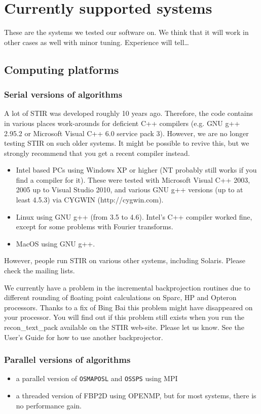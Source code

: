\documentclass{article}
\begin{document}
\section{
Currently supported systems}

These are the systems we tested our software on. We think that 
it will work in other cases as well with minor tuning. Experience 
will tell\dots 



\subsection{
Computing platforms}


\subsubsection{
Serial versions of algorithms}
A lot of STIR was developed roughly 10 years ago. Therefore, the code
contains in various places work-arounds for deficient C++ compilers
(e.g. GNU g++ 2.95.2 or Microsoft Visual C++ 6.0 service pack 3). 
However, we are no longer
testing STIR on such older systems. It might be possible to revive this,
but we strongly recommend that you get a recent compiler instead.
\begin{itemize}
\item 
Intel based PCs using Windows XP or higher (NT probably still works if you
find a compiler for it). These were tested with Microsoft Visual C++ 2003, 2005 up to
Visual Studio 2010,
and various GNU g++ versions (up to at least 4.5.3) via CYGWIN (http://cygwin.com).
\item 
Linux using GNU g++ (from 3.5 to 4.6).
Intel's C++ compiler worked fine, except for some problems with Fourier transforms.
\item
MacOS using GNU g++.
\end{itemize}
However, people run STIR on various other systems, including Solaris. Please
check the mailing lists.

We currently have a problem 
in the incremental backprojection routines due to different rounding 
of floating point calculations on Sparc, HP and Opteron processors. 
Thanks to a fix of Bing Bai this problem might have disappeared on your processor.
You will find out if this problem still exists when you run the 
recon\_text\_pack available on the STIR web-site. Please let us know.
See the User's Guide for how to use another backprojector.


\subsubsection{
Parallel versions of algorithms}
\begin{itemize}
\item a parallel version of \texttt{OSMAPOSL} and \texttt{OSSPS} using MPI 
\item a threaded version of FBP2D using OPENMP, but for most systems, there is no performance gain.
\end{itemize}
\end{document}
